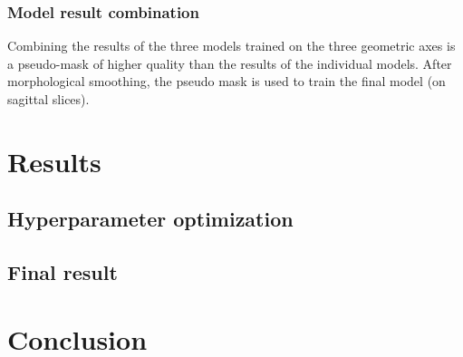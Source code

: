 \begin{multicols}{2}
\subsubsection*{Model result combination}
\par{
    Combining the results of the three models trained on the three geometric axes is a pseudo-mask of higher quality than the results of the individual models.
    After morphological smoothing, the pseudo mask is used to train the final model (on sagittal slices).
}

\thispagestyle{plain}
\section*{Results}
\subsection*{Hyperparameter optimization}


\subsection*{Final result}

\section*{Conclusion}
\cleardoublepage
\end{multicols}